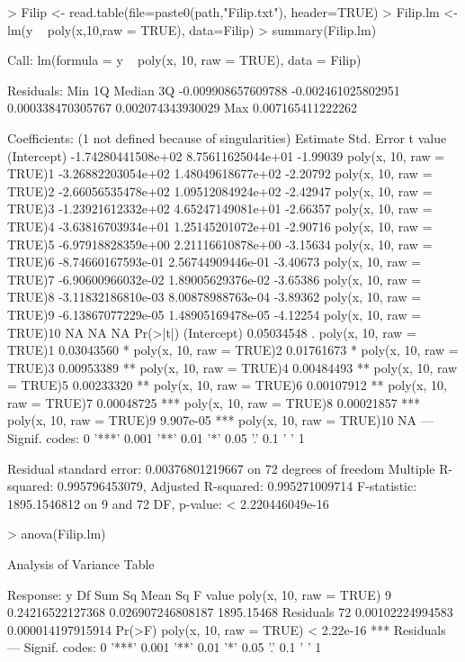\documentclass[10pt]{article}
\begin{document}
\begin{Schunk}
\begin{Sinput}
> Filip <- read.table(file=paste0(path,"Filip.txt"), header=TRUE)
> Filip.lm <- lm(y ~ poly(x,10,raw = TRUE), data=Filip)
> summary(Filip.lm)
\end{Sinput}
\begin{Soutput}
Call:
lm(formula = y ~ poly(x, 10, raw = TRUE), data = Filip)

Residuals:
               Min                 1Q             Median                 3Q 
-0.009908657609788 -0.002461025802951  0.000338470305767  0.002074343930029 
               Max 
 0.007165411222262 

Coefficients: (1 not defined because of singularities)
                                    Estimate         Std. Error  t value
(Intercept)               -1.74280441508e+02  8.75611625044e+01 -1.99039
poly(x, 10, raw = TRUE)1  -3.26882203054e+02  1.48049618677e+02 -2.20792
poly(x, 10, raw = TRUE)2  -2.66056535478e+02  1.09512084924e+02 -2.42947
poly(x, 10, raw = TRUE)3  -1.23921612332e+02  4.65247149081e+01 -2.66357
poly(x, 10, raw = TRUE)4  -3.63816703934e+01  1.25145201072e+01 -2.90716
poly(x, 10, raw = TRUE)5  -6.97918828359e+00  2.21116610878e+00 -3.15634
poly(x, 10, raw = TRUE)6  -8.74660167593e-01  2.56744909446e-01 -3.40673
poly(x, 10, raw = TRUE)7  -6.90600966032e-02  1.89005629376e-02 -3.65386
poly(x, 10, raw = TRUE)8  -3.11832186810e-03  8.00878988763e-04 -3.89362
poly(x, 10, raw = TRUE)9  -6.13867077229e-05  1.48905169478e-05 -4.12254
poly(x, 10, raw = TRUE)10                 NA                 NA       NA
                            Pr(>|t|)    
(Intercept)               0.05034548 .  
poly(x, 10, raw = TRUE)1  0.03043560 *  
poly(x, 10, raw = TRUE)2  0.01761673 *  
poly(x, 10, raw = TRUE)3  0.00953389 ** 
poly(x, 10, raw = TRUE)4  0.00484493 ** 
poly(x, 10, raw = TRUE)5  0.00233320 ** 
poly(x, 10, raw = TRUE)6  0.00107912 ** 
poly(x, 10, raw = TRUE)7  0.00048725 ***
poly(x, 10, raw = TRUE)8  0.00021857 ***
poly(x, 10, raw = TRUE)9   9.907e-05 ***
poly(x, 10, raw = TRUE)10         NA    
---
Signif. codes:  0 '***' 0.001 '**' 0.01 '*' 0.05 '.' 0.1 ' ' 1

Residual standard error: 0.00376801219667 on 72 degrees of freedom
Multiple R-squared:  0.995796453079,	Adjusted R-squared:  0.995271009714 
F-statistic:  1895.1546812 on 9 and 72 DF,  p-value: < 2.220446049e-16
\end{Soutput}
\begin{Sinput}
> anova(Filip.lm)
\end{Sinput}
\begin{Soutput}
Analysis of Variance Table

Response: y
                        Df           Sum Sq           Mean Sq    F value
poly(x, 10, raw = TRUE)  9 0.24216522127368 0.026907246808187 1895.15468
Residuals               72 0.00102224994583 0.000014197915914           
                            Pr(>F)    
poly(x, 10, raw = TRUE) < 2.22e-16 ***
Residuals                             
---
Signif. codes:  0 '***' 0.001 '**' 0.01 '*' 0.05 '.' 0.1 ' ' 1
\end{Soutput}
\end{Schunk}
\end{document}
